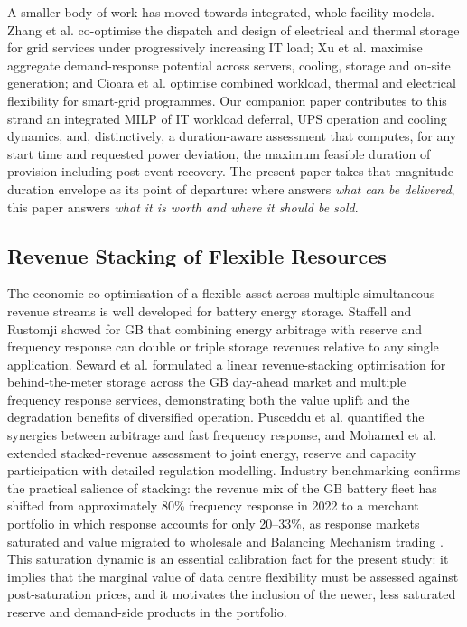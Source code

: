 \documentclass[lettersize,journal]{IEEEtran}
\begin{document}
A smaller body of work has moved towards integrated, whole-facility models. Zhang et al. \cite{zhang2025unlocking} co-optimise the dispatch and design of electrical and thermal storage for grid services under progressively increasing IT load; Xu et al. \cite{xu2023data} maximise aggregate demand-response potential across servers, cooling, storage and on-site generation; and Cioara et al. \cite{cioara2018optimized} optimise combined workload, thermal and electrical flexibility for smart-grid programmes. Our companion paper \cite{takci2026characterisation} contributes to this strand an integrated MILP of IT workload deferral, UPS operation and cooling dynamics, and, distinctively, a duration-aware assessment that computes, for any start time and requested power deviation, the maximum feasible duration of provision including post-event recovery. The present paper takes that magnitude--duration envelope as its point of departure: where \cite{takci2026characterisation} answers \emph{what can be delivered}, this paper answers \emph{what it is worth and where it should be sold}.

\subsection{Revenue Stacking of Flexible Resources}

The economic co-optimisation of a flexible asset across multiple simultaneous revenue streams is well developed for battery energy storage. Staffell and Rustomji \cite{staffell2016maximising} showed for GB that combining energy arbitrage with reserve and frequency response can double or triple storage revenues relative to any single application. Seward et al. \cite{seward2022revenue} formulated a linear revenue-stacking optimisation for behind-the-meter storage across the GB day-ahead market and multiple frequency response services, demonstrating both the value uplift and the degradation benefits of diversified operation. Pusceddu et al. \cite{pusceddu2021synergies} quantified the synergies between arbitrage and fast frequency response, and Mohamed et al. \cite{mohamed2023stacked} extended stacked-revenue assessment to joint energy, reserve and capacity participation with detailed regulation modelling. Industry benchmarking confirms the practical salience of stacking: the revenue mix of the GB battery fleet has shifted from approximately 80\% frequency response in 2022 to a merchant portfolio in which response accounts for only 20--33\%, as response markets saturated and value migrated to wholesale and Balancing Mechanism trading \cite{modo2026benchmark,modo2025november}. This saturation dynamic is an essential calibration fact for the present study: it implies that the marginal value of data centre flexibility must be assessed against post-saturation prices, and it motivates the inclusion of the newer, less saturated reserve and demand-side products in the portfolio.
\end{document}

